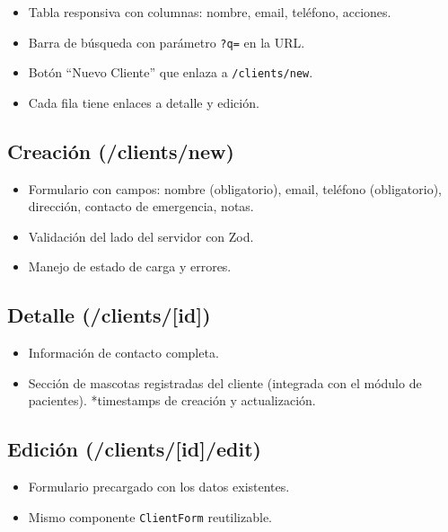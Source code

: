 \begin{itemize}[leftmargin=*]
    \item Tabla responsiva con columnas: nombre, email, tel\'efono, acciones.
    \item Barra de b\'usqueda con par\'ametro \texttt{?q=} en la URL.
    \item Bot\'on ``Nuevo Cliente'' que enlaza a \texttt{/clients/new}.
    \item Cada fila tiene enlaces a detalle y edici\'on.
\end{itemize}

\subsection{Creaci\'on (/clients/new)}

\begin{itemize}[leftmargin=*]
    \item Formulario con campos: nombre (obligatorio), email, tel\'efono
          (obligatorio), direcci\'on, contacto de emergencia, notas.
    \item Validaci\'on del lado del servidor con Zod.
    \item Manejo de estado de carga y errores.
\end{itemize}

\subsection{Detalle (/clients/[id])}

\begin{itemize}[leftmargin=*]
    \item Informaci\'on de contacto completa.
    \item Secci\'on de mascotas registradas del cliente (integrada con
          el m\'odulo de pacientes).
    *timestamps de creaci\'on y actualizaci\'on.
\end{itemize}

\subsection{Edici\'on (/clients/[id]/edit)}

\begin{itemize}[leftmargin=*]
    \item Formulario precargado con los datos existentes.
    \item Mismo componente \texttt{ClientForm} reutilizable.
\end{itemize}

